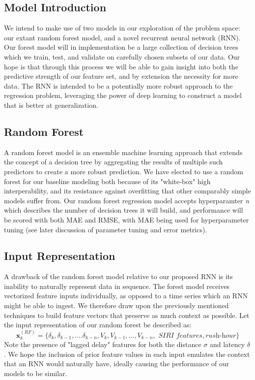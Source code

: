 \documentclass[sigconf]{acmart}
\begin{document}
\subsection{Model Introduction}
We intend to make use of two models in our exploration of the problem space: our extant random forest model, and a novel recurrent neural network (RNN). Our forest model will in implementation be a large collection of decision trees which we train, test, and validate on carefully chosen subsets of our data. Our hope is that through this process we will be able to gain insight into both the predictive strength of our feature set, and by extension the necessity for more data. The RNN is intended to be a potentially more robust approach to the regression problem, leveraging the power of deep learning to construct a model that is better at generalization.


\subsection{Random Forest}
A random forest model is an ensemble machine learning approach that extends the concept of a decision tree by aggregating the results of multiple such predictors to create a more robust prediction. We have elected to use a random forest for our baseline modeling both because of its "white-box" high interperability, and its resistance against overfitting that other comparably simple models suffer from. Our random forest regression model accepts hyperparamter \textit{n} which describes the number of decision trees it will build, and performance will be scored with both MAE and RMSE, with MAE being used for hyperparameter tuning (see later discussion of parameter tuning and error metrics).

\subsection{Input Representation}
A drawback of the random forest model relative to our proposed RNN is its inability to naturally represent data in sequence. The forest model receives vectorized feature inputs individually, as opposed to a time series which an RNN might be able to ingest. We therefore draw upon the previously mentioned techniques to build feature vectors that preserve as much context as possible. Let the input representation of our random forest be described as:
$$\textbf{x}_k^{(RF)} = \{\delta_k, \delta_{k-1}, \ldots. \delta_{k-n}, V_k, V_{k-1}, \ldots, V_{k-n}, \textit{\ \ SIRI \  features}, \textit{rush-hour}\}$$
Note the presence of "lagged delay" features for both the distance $\sigma$ and latency $\delta$. We hope the inclusion of prior feature values in each input emulates the context that an RNN would naturally have, ideally causing the performance of our models to be similar. 
\end{document}
